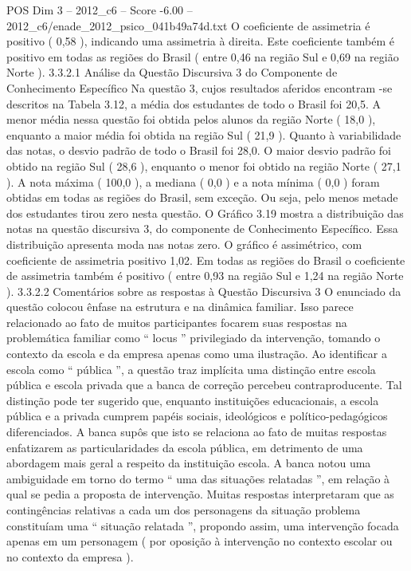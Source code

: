 \begin{textsample}{POS Dim 3 – 2012\_c6 – Score -6.00 – 2012\_c6/enade\_2012\_psico\_041b49a74d.txt}
O coeficiente de assimetria é positivo ( 0,58 ), indicando uma assimetria à direita.
Este coeficiente também é positivo em todas as regiões do Brasil ( entre 0,46 na região Sul e 0,69 na região Norte ). 3.3.2.1 Análise da Questão Discursiva 3 do Componente de Conhecimento Específico Na questão 3, cujos resultados aferidos encontram -se descritos na Tabela 3.12, a média dos estudantes de todo o Brasil foi 20,5.
A menor média nessa questão foi obtida pelos alunos da região Norte ( 18,0 ), enquanto a maior média foi obtida na região Sul ( 21,9 ).
Quanto à variabilidade das notas, o desvio padrão de todo o Brasil foi 28,0.
O maior desvio padrão foi obtido na região Sul ( 28,6 ), enquanto o menor foi obtido na região Norte ( 27,1 ).
A nota máxima ( 100,0 ), a mediana ( 0,0 ) e a nota mínima ( 0,0 ) foram obtidas em todas as regiões do Brasil, sem exceção.
Ou seja, pelo menos metade dos estudantes tirou zero nesta questão.
O Gráfico 3.19 mostra a distribuição das notas na questão discursiva 3, do componente de Conhecimento Específico.
Essa distribuição apresenta moda nas notas zero.
O gráfico é assimétrico, com coeficiente de assimetria positivo 1,02.
Em todas as regiões do Brasil o coeficiente de assimetria também é positivo ( entre 0,93 na região Sul e 1,24 na região Norte ). 3.3.2.2 Comentários sobre as respostas à Questão Discursiva 3 O enunciado da questão colocou ênfase na estrutura e na dinâmica familiar.
Isso parece relacionado ao fato de muitos participantes focarem suas respostas na problemática familiar como “ locus ” privilegiado da intervenção, tomando o contexto da escola e da empresa apenas como uma ilustração.
Ao identificar a escola como “ pública ”, a questão traz implícita uma distinção entre escola pública e escola privada que a banca de correção percebeu contraproducente.
Tal distinção pode ter sugerido que, enquanto instituições educacionais, a escola pública e a privada cumprem papéis sociais, ideológicos e político-pedagógicos diferenciados.
A banca supôs que isto se relaciona ao fato de muitas respostas enfatizarem as particularidades da escola pública, em detrimento de uma abordagem mais geral a respeito da instituição escola.
A banca notou uma ambiguidade em torno do termo “ uma das situações relatadas ”, em relação à qual se pedia a proposta de intervenção.
Muitas respostas interpretaram que as contingências relativas a cada um dos personagens da situação problema constituíam uma “ situação relatada ”, propondo assim, uma intervenção focada apenas em um personagem ( por oposição à intervenção no contexto escolar ou no contexto da empresa ).

\end{textsample}
